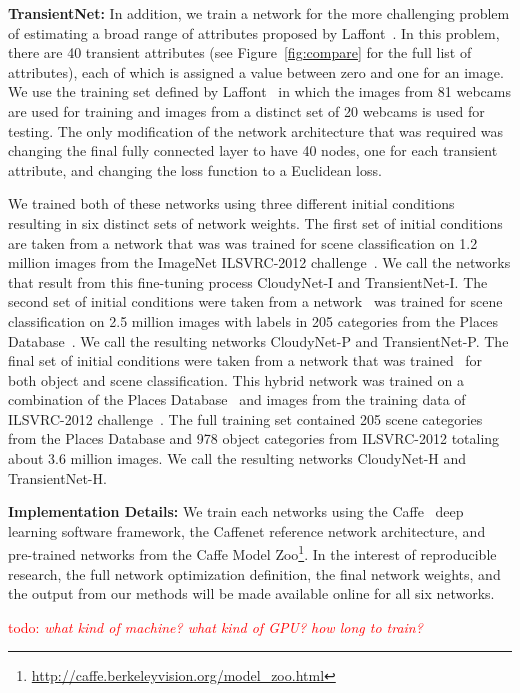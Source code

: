 \documentclass{article}
\newcommand{\todo}[1]{\textcolor{red}{todo: {\em #1}}}
\newcommand{\figref}[1]{Figure~\ref{fig:#1}}
\begin{document}
\textbf{TransientNet:} In addition, we train a network for the more
challenging problem of estimating a broad range of attributes proposed
by Laffont~\cite{Laffont14}.  In this problem, there are 40 transient
attributes (see \figref{compare} for the full list of
attributes), each of which is assigned a value between zero and one
for an image. We use the training set defined by
Laffont~\cite{Laffont14} in which the images from 81 webcams are used
for training and images from a distinct set of 20 webcams is used for
testing.  The only modification of the network architecture that was
required was changing the final fully connected layer to have 40
nodes, one for each transient attribute, and changing the loss
function to a Euclidean loss. 

We trained both of these networks using three different initial
conditions resulting in six distinct sets of network weights. The
first set of initial conditions are taken from a network that was was
trained for scene classification on 1.2 million images from the
ImageNet ILSVRC-2012 challenge~\cite{ILSVRCarxiv14}.  We call the
networks that result from this fine-tuning process CloudyNet-I and
TransientNet-I.  The second set of initial conditions were taken from
a network~\cite{zhou2014places} was trained for scene classification
on 2.5 million images with labels in 205 categories from the Places
Database~\cite{zhou2014places}. We call the resulting networks
CloudyNet-P and TransientNet-P.  The final set of initial conditions
were taken from a network that was trained~\cite{zhou2014places} for
both object and scene classification.  This hybrid network was trained
on a combination of the Places Database~\cite{zhou2014places} and
images from the training data of ILSVRC-2012
challenge~\cite{ILSVRCarxiv14}.  The full training set contained 205
scene categories from the Places Database and 978 object categories
from ILSVRC-2012 totaling about 3.6 million images.  We call the
resulting networks CloudyNet-H and TransientNet-H.

\textbf{Implementation Details:} We train each networks using the
Caffe~\cite{caffe14} deep learning software framework, the Caffenet
reference network architecture, and pre-trained networks from the
Caffe Model
Zoo\footnote{\url{http://caffe.berkeleyvision.org/model_zoo.html}}.
In the interest of reproducible research, the full network
optimization definition, the final network weights, and the output
from our methods will be made available online for all six networks.

\todo{what kind of machine? what kind of GPU? how long to train?}
\end{document}
